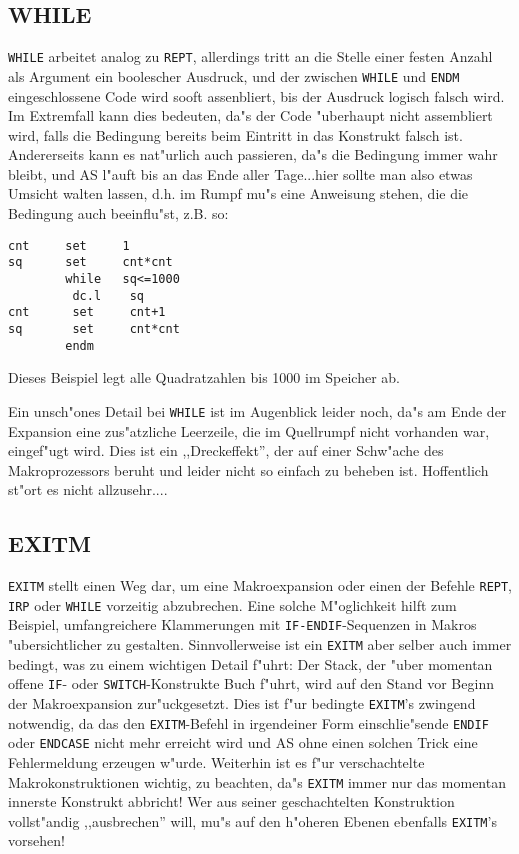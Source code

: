\documentclass[12pt,a4paper,twoside]{report}
\makeatletter
\newcommand{\tty}[1]{{\tt #1}}
\newcommand{\ttindex}[1]{\index{#1@{\tt #1}}}
\makeatother
\begin{document}

\subsection{WHILE}
\ttindex{WHILE}

\tty{WHILE} arbeitet analog zu \tty{REPT}, allerdings tritt an die
Stelle einer festen Anzahl als Argument ein boolescher Ausdruck, und
der zwischen \tty{WHILE} und \tty{ENDM} eingeschlossene Code wird sooft
assenbliert, bis der Ausdruck logisch falsch wird.  Im Extremfall kann
dies bedeuten, da"s der Code "uberhaupt nicht assembliert wird, falls die
Bedingung bereits beim Eintritt in das Konstrukt falsch ist.  Andererseits
kann es nat"urlich auch passieren, da"s die Bedingung immer wahr bleibt,
und AS l"auft bis an das Ende aller Tage...hier sollte man also etwas
Umsicht walten lassen, d.h. im Rumpf mu"s eine Anweisung stehen, die die
Bedingung auch beeinflu"st, z.B. so:
\begin{verbatim}
cnt     set     1
sq      set     cnt*cnt
        while   sq<=1000
         dc.l    sq
cnt      set     cnt+1
sq       set     cnt*cnt
        endm
\end{verbatim}
Dieses Beispiel legt alle Quadratzahlen bis 1000 im Speicher ab.
\par
Ein unsch"ones Detail bei \tty{WHILE} ist im Augenblick leider noch,
da"s am Ende der Expansion eine zus"atzliche Leerzeile, die im Quellrumpf
nicht vorhanden war, eingef"ugt wird.  Dies ist ein ,,Dreckeffekt'',
der auf einer Schw"ache des Makroprozessors beruht und leider nicht so
einfach zu beheben ist.  Hoffentlich st"ort es nicht allzusehr....


\subsection{EXITM}
\ttindex{EXITM}

\tty{EXITM} stellt einen Weg dar, um eine Makroexpansion oder einen der
Befehle \tty{REPT}, \tty{IRP} oder \tty{WHILE} vorzeitig abzubrechen.
Eine solche M"oglichkeit hilft zum Beispiel, umfangreichere Klammerungen
mit \tty{IF-ENDIF}-Sequenzen in Makros "ubersichtlicher zu gestalten.
Sinnvollerweise ist ein \tty{EXITM} aber selber auch immer bedingt, was zu
einem wichtigen Detail f"uhrt: Der Stack, der "uber momentan offene
\tty{IF}- oder \tty{SWITCH}-Konstrukte Buch f"uhrt, wird auf den Stand vor
Beginn der Makroexpansion zur"uckgesetzt.  Dies ist f"ur bedingte
\tty{EXITM}'s zwingend notwendig, da das den \tty{EXITM}-Befehl in
irgendeiner Form einschlie"sende \tty{ENDIF} oder \tty{ENDCASE} nicht mehr
erreicht wird und AS ohne einen solchen Trick eine Fehlermeldung erzeugen
w"urde.  Weiterhin ist es f"ur verschachtelte Makrokonstruktionen
wichtig, zu beachten, da"s \tty{EXITM} immer nur das momentan innerste
Konstrukt abbricht!  Wer aus seiner geschachtelten Konstruktion
vollst"andig ,,ausbrechen'' will, mu"s auf den h"oheren Ebenen ebenfalls
\tty{EXITM}'s vorsehen!
\end{document}

